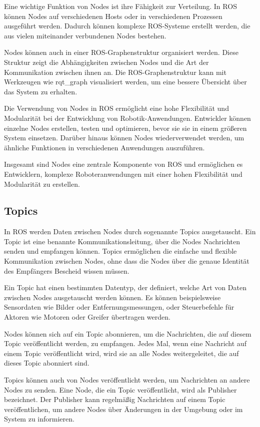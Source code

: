     Eine wichtige Funktion von Nodes ist ihre Fähigkeit zur Verteilung. In \ac{ROS} können Nodes auf verschiedenen Hosts oder in verschiedenen Prozessen ausgeführt werden. Dadurch können komplexe \ac{ROS}-Systeme erstellt werden, die aus vielen miteinander verbundenen Nodes bestehen.

    Nodes können auch in einer \ac{ROS}-Graphenstruktur organisiert werden. Diese Struktur zeigt die Abhängigkeiten zwischen Nodes und die Art der Kommunikation zwischen ihnen an. Die \ac{ROS}-Graphenstruktur kann mit Werkzeugen wie rqt\_graph visualisiert werden, um eine bessere Übersicht über das System zu erhalten.

    Die Verwendung von Nodes in \ac{ROS} ermöglicht eine hohe Flexibilität und Modularität bei der Entwicklung von Robotik-Anwendungen. Entwickler können einzelne Nodes erstellen, testen und optimieren, bevor sie sie in einem größeren System einsetzen. Darüber hinaus können Nodes wiederverwendet werden, um ähnliche Funktionen in verschiedenen Anwendungen auszuführen.

    Insgesamt sind Nodes eine zentrale Komponente von \ac{ROS} und ermöglichen es Entwicklern, komplexe Roboteranwendungen mit einer hohen Flexibilität und Modularität zu erstellen.

    \subsection{Topics} \label{topics:subsection}
    In \ac{ROS} werden Daten zwischen Nodes durch sogenannte Topics ausgetauscht. Ein Topic ist eine benannte Kommunikationsleitung, über die Nodes Nachrichten senden und empfangen können. Topics ermöglichen die einfache und flexible Kommunikation zwischen Nodes, ohne dass die Nodes über die genaue Identität des Empfängers Bescheid wissen müssen.

    Ein Topic hat einen bestimmten Datentyp, der definiert, welche Art von Daten zwischen Nodes ausgetauscht werden können. Es können beispielsweise Sensordaten wie Bilder oder Entfernungsmessungen, oder Steuerbefehle für Aktoren wie Motoren oder Greifer übertragen werden.

    Nodes können sich auf ein Topic abonnieren, um die Nachrichten, die auf diesem Topic veröffentlicht werden, zu empfangen. Jedes Mal, wenn eine Nachricht auf einem Topic veröffentlicht wird, wird sie an alle Nodes weitergeleitet, die auf dieses Topic abonniert sind.

    Topics können auch von Nodes veröffentlicht werden, um Nachrichten an andere Nodes zu senden. Eine Node, die ein Topic veröffentlicht, wird als Publisher bezeichnet. Der Publisher kann regelmäßig Nachrichten auf einem Topic veröffentlichen, um andere Nodes über Änderungen in der Umgebung oder im System zu informieren.

